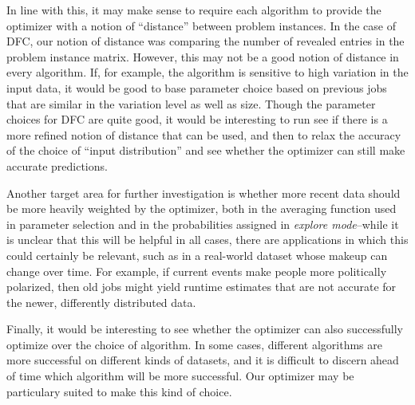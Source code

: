 In line with this, it may make sense to require each algorithm to provide 
the optimizer with a notion of ``distance'' between problem instances.
In the case of DFC, our notion of distance was comparing the number
of revealed entries in the problem instance matrix. However, this may
not be a good notion of distance in every algorithm. If, for example, the 
algorithm is sensitive to high variation in the input data, it would be
good to base parameter choice based on previous jobs that are similar
in the variation level as well as size. Though the parameter choices for
DFC are quite good, it would be interesting to run see if there is a 
more refined notion of distance that can be used, and then to relax the
accuracy of the choice of ``input distribution'' and see whether the 
optimizer can still make accurate predictions.

Another target area for further investigation is whether more recent
data should be more heavily weighted by the optimizer, both in the
averaging function used in parameter selection and in the probabilities
assigned in {\em explore mode}--while it is unclear that this will be 
helpful in all cases, there are applications in which this could certainly
be relevant, such as in a real-world dataset whose makeup can change
over time. For example, if current events make people more politically
polarized, then old jobs might yield runtime estimates that are not
accurate for the newer, differently distributed data. 

Finally, it would be interesting to see whether the optimizer can also 
successfully optimize over the choice of algorithm. In some cases,
different algorithms are more successful on different kinds of datasets, 
and it is difficult to discern ahead of time which algorithm will be more
successful. Our optimizer may be particulary suited to make this kind of
choice.
